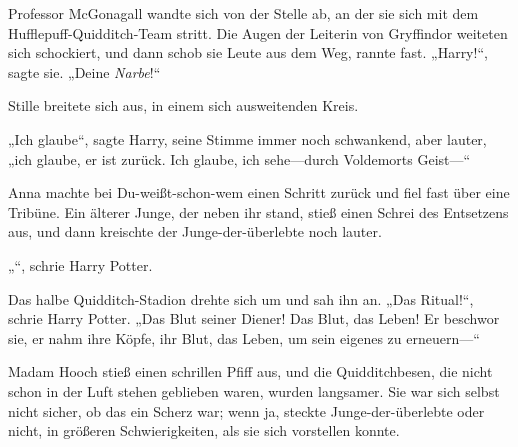 Professor McGonagall wandte sich von der Stelle ab, an der sie sich mit dem Hufflepuff-Quidditch-Team stritt. Die Augen der Leiterin von Gryffindor weiteten sich schockiert, und dann schob sie Leute aus dem Weg, rannte fast.
„Harry!“, sagte sie. „Deine \emph{Narbe}!“

Stille breitete sich aus, in einem sich ausweitenden Kreis.

„Ich glaube“, sagte Harry, seine Stimme immer noch schwankend, aber lauter, „ich glaube, er ist zurück. Ich glaube, ich sehe—durch Voldemorts Geist—“

Anna machte bei Du-weißt-schon-wem einen Schritt zurück und fiel fast über eine Tribüne. Ein älterer Junge, der neben ihr stand, stieß einen Schrei des Entsetzens aus, und dann kreischte der Junge-der-überlebte noch lauter.

„“, schrie Harry Potter.

Das halbe Quidditch-Stadion drehte sich um und sah ihn an. „Das Ritual!“, schrie Harry Potter. „Das Blut seiner Diener! Das Blut, das Leben! Er beschwor sie, er nahm ihre Köpfe, ihr Blut, das Leben, um sein eigenes zu erneuern—“

Madam Hooch stieß einen schrillen Pfiff aus, und die Quidditchbesen, die nicht schon in der Luft stehen geblieben waren, wurden langsamer. Sie war sich selbst nicht sicher, ob das ein Scherz war; wenn ja, steckte Junge-der-überlebte oder nicht, in größeren Schwierigkeiten, als sie sich vorstellen konnte.

